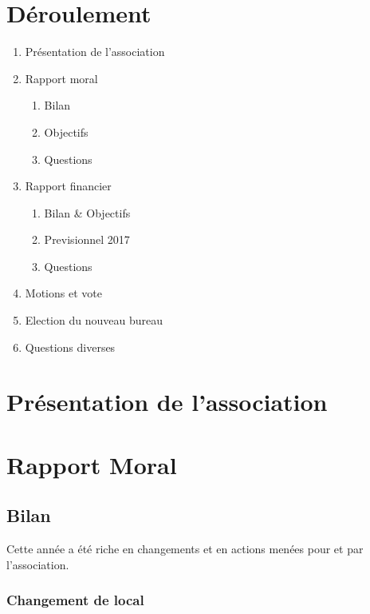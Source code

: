 \documentclass[11pt]{article}
\begin{document}
\vspace{1.5cm}

\section*{Déroulement}

\begin{enumerate}
    \item Présentation de l'association
    \item Rapport moral
        \begin{enumerate}
            \item Bilan
            \item Objectifs
            \item Questions
        \end{enumerate}
    \item Rapport financier
        \begin{enumerate}
            \item Bilan \& Objectifs
            \item Previsionnel 2017
            \item Questions
        \end{enumerate}
    \item Motions et vote
    \item Election du nouveau bureau
    \item Questions diverses
\end{enumerate}

\section{Présentation de l'association}


\section{Rapport Moral}

\subsection{Bilan}

Cette année a été riche en changements et en actions menées pour et par l'association.

\subsubsection{Changement de local}
\end{document}
